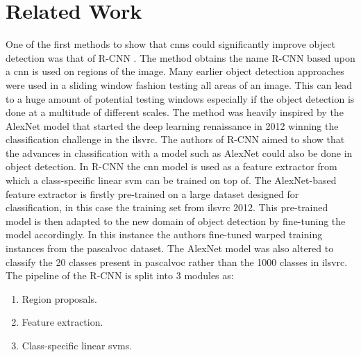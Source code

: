 \begin{comment}
	- CNN approaches
	- R-CNN - fast - faster
	- SSD
	- R-FCN
	- YOLO (speed)	

	- outline overall CNN methods
		- R-CNN
		- single-shot
	- cites to specific implementations within each
		- inspiration from imagenet / ms coco


	- history from contextual priming and feedback for faster RCNN
		- manually designed features (13, 22) to convnet features (29, 37, 44, 68)
		- from sliding window approaches (22, 77) to region proposals (228, 29, 32, 63, 78)
		- from pipeline RCNN to end-to-end Fast and Faster 
\end{comment}

\section{Related Work}\label{sec:related}
One of the first methods to show that \glspl{cnn} could significantly improve object detection was that of R-CNN \cite{rcnn}. The method obtains the name R-CNN based upon a \gls{cnn} is used on regions of the image. Many earlier object detection approaches were used in a sliding window fashion testing all areas of an image. This can lead to a huge amount of potential testing windows especially if the object detection is done at a multitude of different scales. The method was heavily inspired by the AlexNet model that started the deep learning renaissance in 2012 winning the classification challenge in the \gls{ilsvrc}. The authors of R-CNN aimed to show that the advances in classification with a model such as AlexNet could also be done in object detection. In R-CNN the \gls{cnn} model is used as a feature extractor from which a class-specific linear \gls{svm} can be trained on top of. The AlexNet-based feature extractor is firstly pre-trained on a large dataset designed for classification, in this case the training set from \gls{ilsvrc} 2012. This pre-trained model is then adapted to the new domain of object detection by fine-tuning the model accordingly. In this instance the authors fine-tuned warped training instances from the \gls{pascalvoc} dataset. The AlexNet model was also altered to classify the 20 classes present in \gls{pascalvoc} rather than the 1000 classes in \gls{ilsvrc}. The pipeline of the R-CNN is split into 3 modules as:

\begin{enumerate}
	\item Region proposals.
	\item Feature extraction.
	\item Class-specific linear \glspl{svm}.
\end{enumerate}

